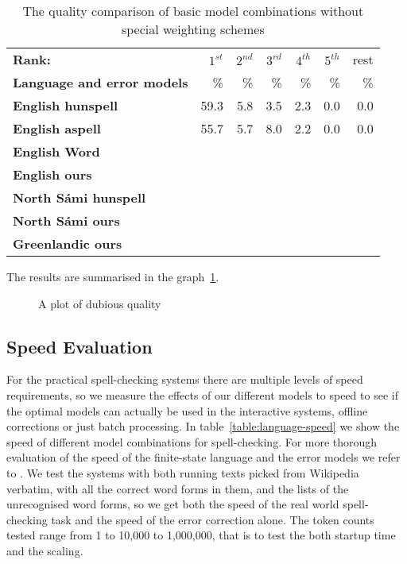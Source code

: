 \documentclass[a4paper,12pt]{article}
\begin{document}
\begin{table}
    \centering
    \begin{tabular}{|l|r|r|r|r|r|r|}
        \hline
        \bf Rank: & $1^{st}$ & $2^{nd}$ & $3^{rd}$ & $4^{th}$ & $5^{th}$ & rest \\
        \bf Language and error models &  \% & \% & \% & \% & \% & \% \\
        \hline
        \bf English hunspell & 59.3 & 5.8 & 3.5 & 2.3 & 0.0 & 0.0 \\
          \bf English aspell & 55.7 & 5.7 & 8.0 & 2.2 & 0.0 & 0.0 \\
            \bf English Word & & & & & &  \\
            \bf English ours & & & & & & \\
        \hline
        \bf North Sámi hunspell & & & & & & \\
            \bf North Sámi ours & & & & & & \\
        \hline
        \bf Greenlandic ours & & & & & & \\
        \hline
    \end{tabular}
    \caption{The quality comparison of basic model combinations without special
    weighting schemes\label{table:commercial-quality}}
\end{table}

The results are summarised in the graph~\ref{fig:quality}.

\begin{figure}
    \centering
    \caption{A plot of dubious quality
    \label{fig:quality}}
\end{figure}


\subsection{Speed Evaluation}

For the practical spell-checking systems there are multiple levels of speed
requirements, so we measure the effects of our different models to speed to see
if the optimal models can actually be used in the interactive systems, offline
corrections or just batch processing. In table~\ref{table:language-speed} we
show the speed of different model combinations for spell-checking. For more
thorough evaluation of the speed of the finite-state language and the error
models we refer to \cite{pirinen2012improving}. We test the systems with both
running texts picked from Wikipedia verbatim, with all the correct word forms
in them, and the lists of the unrecognised word forms, so we get both the speed
of the real world spell-checking task and the speed of the error correction
alone. The token counts tested range from 1 to 10,000 to 1,000,000, that is to
test the both startup time and the scaling.
\end{document}
